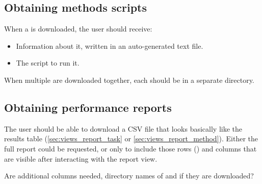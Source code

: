 
\subsection{Obtaining methods scripts}
\label{sec:downloads_method}

When a \Method is downloaded, the user should receive:
\begin{itemize}
    \item Information about it, written in an auto-generated text file.
    \item The script to run it.
\end{itemize}

When multiple \Methods are downloaded together, each should be in a separate directory.


\subsection{Obtaining performance reports}
\label{sec:downloads_report}

The user should be able to download a CSV file that looks basically like the results table \Report (\cref{sec:views_report_task} or \cref{sec:views_report_method}).
Either the full report could be requested, or only to include those rows (\Elements) and columns that are visible after interacting with the report view.

Are additional columns needed, \eg directory names of \Elements and \Methods if they are downloaded?
